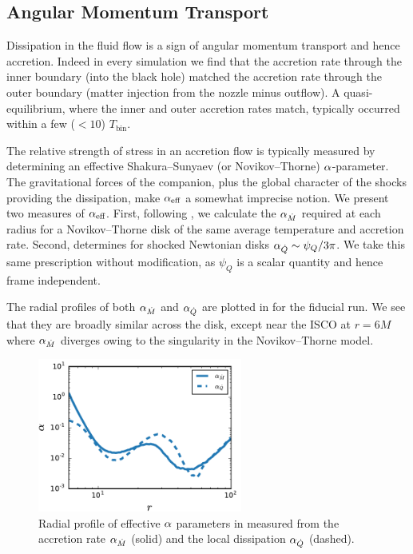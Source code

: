 \subsection{Angular Momentum Transport}

Dissipation in the fluid flow is a sign of angular momentum transport and hence accretion. Indeed in every simulation we find that the accretion rate through the inner boundary (into the black hole) matched the accretion rate through the outer boundary (matter injection from the nozzle minus outflow).  A quasi-equilibrium, where the inner and outer accretion rates match, typically occurred within a few ($<10$) $T_\text{bin}$. 

The relative strength of stress in an accretion flow is typically measured by determining an effective Shakura--Sunyaev (or Novikov--Thorne) $\alpha$-parameter.  The gravitational forces of the companion, plus the global character of the shocks providing the dissipation, make $\alpha_{\text{eff}}$ a somewhat imprecise notion.  We present two measures of $\alpha_{\text{eff}}$.  First, following \cite{Ju16}, we calculate the $\alpha_{\dot{M}}$ required at each radius for a Novikov--Thorne disk of the same average temperature and accretion rate.  Second, \cite{Rafikov16} determines for shocked Newtonian disks $\alpha_{\dot{Q}} \sim \psi_Q / 3\pi$.  We take this same prescription without modification, as $\psi_Q$ is a scalar quantity and hence frame independent.  

The radial profiles of both $\alpha_{\dot{M}}$ and $\alpha_{\dot{Q}}$ are plotted in  for the fiducial run.  We see that they are broadly similar across the disk, except near the ISCO at $r=6M$ where $\alpha_{\dot{M}}$ diverges owing to the singularity in the Novikov--Thorne model.

\begin{figure}
\begin{center}
\includegraphics[width=0.6\textwidth]{figures/minidisk/q011_m3_alpha_r.pdf}
\end{center}
\caption{ Radial profile of effective $\alpha$ parameters in  measured from the accretion rate $\alpha_{\dot{M}}$ (solid) and the local dissipation $\alpha_{\dot{Q}}$ (dashed).}
\end{figure}

